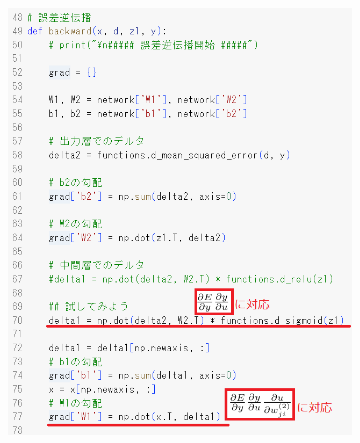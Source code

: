 \documentclass{ltjsarticle}
\begin{document}
\begin{figure}[ht]
\begin{subfigure}[b]{0.45\textwidth}
    \includegraphics[width=\textwidth]{./capture/confirm_test/day1_10_2.png}
    \caption{}
    \label{fig:day1_10_2}
  \end{subfigure}
  \caption{}
\end{figure}

\newpage
\end{document}
